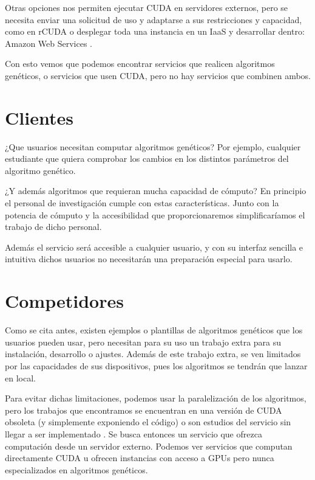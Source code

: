 \bigskip
Otras opciones nos permiten ejecutar CUDA en servidores externos, pero se necesita enviar una solicitud de uso y adaptarse a sus restricciones y capacidad, como en rCUDA \cite{rcuda}
o desplegar toda una instancia en un IaaS y desarrollar dentro: Amazon Web Services \cite{amazoncuda}.

\bigskip
Con esto vemos que podemos encontrar servicios que realicen algoritmos genéticos, o servicios que usen CUDA, pero no hay servicios que combinen ambos.


\bigskip
\section{Clientes}
\bigskip

¿Que usuarios necesitan computar algoritmos genéticos?
Por ejemplo, cualquier estudiante que quiera comprobar los cambios en los distintos parámetros del algoritmo genético.

¿Y además algoritmos que requieran mucha capacidad de cómputo? En principio el personal de investigación cumple con estas características. Junto con la potencia de cómputo y la accesibilidad que proporcionaremos simplificaríamos el trabajo de dicho personal. 

Además el servicio será accesible a cualquier usuario, y con su interfaz sencilla e intuitiva dichos usuarios no necesitarán una preparación especial para usarlo. 

\bigskip
\section{Competidores}
\bigskip

Como se cita antes, existen ejemplos o plantillas de algoritmos genéticos \cite{agpython} \cite{agjava} \cite{agmatlab} que los usuarios pueden usar, pero necesitan para su uso un trabajo extra para su instalación, desarrollo o ajustes. Además de este trabajo extra, se ven limitados por las capacidades de sus dispositivos, pues los algoritmos se tendrán que lanzar en local.

Para evitar dichas limitaciones, podemos usar la paralelización de los algoritmos, pero los trabajos que encontramos se encuentran en una versión de CUDA obsoleta \cite{paralelizacioncuda} (y simplemente exponiendo el código) o son estudios del servicio sin llegar a ser implementado \cite{optimizacionparalelizacioncuda}. Se busca entonces un servicio que ofrezca computación desde un servidor externo. Podemos ver servicios que computan directamente CUDA \cite{rcuda} u ofrecen instancias con acceso a GPUs \cite{amazoncuda}  pero nunca especializados en algoritmos genéticos.


